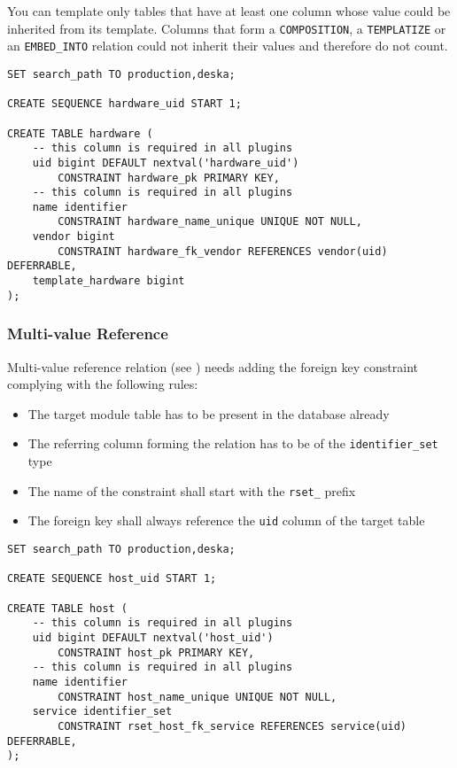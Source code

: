 \documentclass[deska]{subfiles}
\begin{document}
You can template only tables that have at least one column whose value could be inherited from its template.  Columns
that form a {\tt COMPOSITION}, a {\tt TEMPLATIZE} or an {\tt EMBED\_INTO} relation could not inherit their values and
therefore do not count.

\begin{verbatim}
SET search_path TO production,deska;

CREATE SEQUENCE hardware_uid START 1;

CREATE TABLE hardware (
    -- this column is required in all plugins
    uid bigint DEFAULT nextval('hardware_uid')
        CONSTRAINT hardware_pk PRIMARY KEY,
    -- this column is required in all plugins
    name identifier
        CONSTRAINT hardware_name_unique UNIQUE NOT NULL,
    vendor bigint 
        CONSTRAINT hardware_fk_vendor REFERENCES vendor(uid) DEFERRABLE,
    template_hardware bigint
);
\end{verbatim}


\subsubsection{Multi-value Reference}

Multi-value reference relation (see ) needs adding the foreign key
constraint complying with the following rules:

\begin{itemize}
    \item The target module table has to be present in the database already
    \item The referring column forming the relation has to be of the {\tt identifier\_set} type
    \item The name of the constraint shall start with the {\tt rset\_} prefix
    \item The foreign key shall always reference the {\tt uid} column of the target table
\end{itemize}

\begin{verbatim}
SET search_path TO production,deska;

CREATE SEQUENCE host_uid START 1;

CREATE TABLE host (
    -- this column is required in all plugins
    uid bigint DEFAULT nextval('host_uid')
        CONSTRAINT host_pk PRIMARY KEY,
    -- this column is required in all plugins
    name identifier
        CONSTRAINT host_name_unique UNIQUE NOT NULL,
    service identifier_set
        CONSTRAINT rset_host_fk_service REFERENCES service(uid) DEFERRABLE,
);
\end{verbatim}
\end{document}
